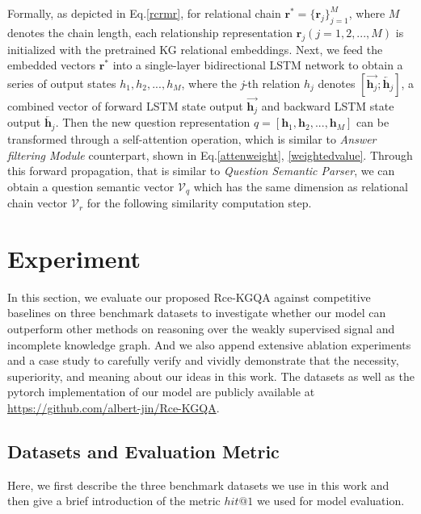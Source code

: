 \documentclass[pdflatex,sn-mathphys]{sn-jnl}%
\theoremstyle{thmstyleone}%
\theoremstyle{thmstyletwo}%
\theoremstyle{thmstylethree}%
\begin{document}
Formally, as depicted in Eq.\ref{rcrmr}, for relational chain $\mathbf{r}^{*} =\{\textbf{r}_{j}\}_{j=1}^{M}$, where $M$ denotes the chain length, each relationship representation $\textbf{r}_{j}(j = 1,2,...,M)$ is initialized with the pretrained KG relational embeddings. Next, we feed the embedded vectors $\mathbf{r}^{*}$ into a single-layer bidirectional LSTM network to obtain a series of output states $h_{1}, h_{2},... , h_{M}$, where the \textit{j}-th relation $h_{j}$ denotes $[\overrightarrow{\mathbf{h}_{j}};\overleftarrow{\mathbf{h}_{j}}]$, a combined vector of forward LSTM state output $\overrightarrow{\mathbf{h}_{j}}$ and backward LSTM state output $\overleftarrow{\mathbf{h}_{j}}$. Then the new question representation $q = [\mathbf{h}_{1}, \mathbf{h}_{2},... , \mathbf{h}_{M}]$ can be transformed through a self-attention operation, which is similar to \textit{Answer filtering Module} counterpart, shown in Eq.\ref{attenweight}, \ref{weightedvalue}. Through this forward propagation, that is similar to \textit{Question Semantic Parser}, we can obtain a question semantic vector $\mathcal{V}_{q}$ which has the same dimension as relational chain vector $\mathcal{V}_{r}$ for the following similarity computation step.

\section{Experiment}

\label{experiment}
In this section, we evaluate our proposed Rce-KGQA against competitive baselines on three benchmark datasets to investigate whether our model can outperform other methods on reasoning over the weakly supervised signal and incomplete knowledge graph. And we also append extensive ablation experiments and a case study to carefully verify and vividly demonstrate that the necessity, superiority, and meaning about our ideas in this work. The datasets as well as the pytorch implementation of our model are publicly available at \url{https://github.com/albert-jin/Rce-KGQA}.

\subsection{Datasets and Evaluation Metric}

Here, we first describe the three benchmark datasets we use in this work and then give a brief introduction of the metric $hit@1$ we used for model evaluation.
\end{document}
